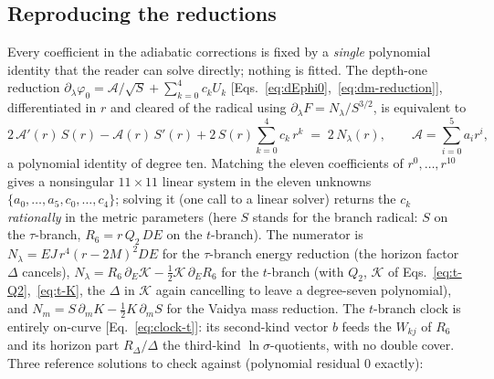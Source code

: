 \documentclass[12pt]{iopart}
\begin{document}
\subsection{Reproducing the reductions}
\label{app:reproduce}
Every coefficient in the adiabatic corrections is fixed by a \emph{single}
polynomial identity that the reader can solve directly; nothing is fitted. The
depth-one reduction $\partial_\lambda\varphi_0=\mathcal{A}/\sqrt S+\sum_{k=0}^4 c_k
U_k$ [Eqs.~\eqref{eq:dEphi0},~\eqref{eq:dm-reduction}], differentiated in $r$ and
cleared of the radical using $\partial_\lambda F=N_\lambda/S^{3/2}$, is equivalent to
\begin{equation}
    2\,\mathcal{A}'(r)\,S(r)-\mathcal{A}(r)\,S'(r)
    +2\,S(r)\sum_{k=0}^4 c_k\,r^k \;=\; 2\,N_\lambda(r),
    \qquad \mathcal{A}=\sum_{i=0}^5 a_i r^i,
    \label{eq:reduction-identity}
\end{equation}
a polynomial identity of degree ten. Matching the eleven coefficients of
$r^0,\dots,r^{10}$ gives a nonsingular $11\times11$ linear system in the eleven
unknowns $\{a_0,\dots,a_5,c_0,\dots,c_4\}$; solving it (one call to a linear solver)
returns the $c_k$ \emph{rationally} in the metric parameters (here $S$ stands for the
branch radical: $S$ on the $\tau$-branch, $R_6=r\,Q_2\,DE$ on the $t$-branch). The
numerator is $N_\lambda=EJ\,r^4(r-2M)^2 DE$ for the $\tau$-branch energy reduction
(the horizon factor $\Delta$ cancels), $N_\lambda=R_6\,\partial_E\mathcal K
-\tfrac12\mathcal K\,\partial_E R_6$ for the $t$-branch (with $Q_2$, $\mathcal K$ of
Eqs.~\eqref{eq:t-Q2},~\eqref{eq:t-K}, the $\Delta$ in $\mathcal K$ again cancelling to
leave a degree-seven polynomial), and $N_m=S\,\partial_m K-\tfrac12K\,\partial_m S$
for the Vaidya mass reduction. The $t$-branch clock is entirely on-curve
[Eq.~\eqref{eq:clock-t}]: its second-kind vector $b$ feeds the $W_{kj}$ of $R_6$ and
its horizon part $R_\Delta/\Delta$ the third-kind $\ln\sigma$-quotients, with no
double cover. Three reference solutions to check against (polynomial residual $0$
exactly):
\end{document}
